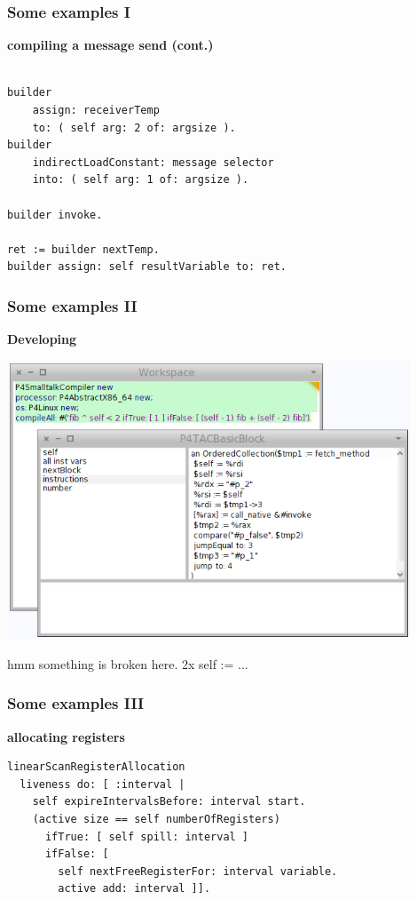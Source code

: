 \documentclass{beamer}
\begin{document}
\begin{frame}[fragile]
    \frametitle{Some examples I}
    {\bf compiling a message send (cont.)}
    \begin{lstlisting}
    
builder 
    assign: receiverTemp 
    to: ( self arg: 2 of: argsize ).
builder 
    indirectLoadConstant: message selector 
    into: ( self arg: 1 of: argsize ).
        
builder invoke.

ret := builder nextTemp.
builder assign: self resultVariable to: ret.

    \end{lstlisting}
\end{frame}

\begin{frame}[fragile]
    \frametitle{Some examples II}
    {\bf Developing}
    \begin{center}\includegraphics[width=0.9\textwidth]{developing.png}\end{center}
    hmm something is broken here. 2x self := ...
\end{frame}

\begin{frame}[fragile]
    \frametitle{Some examples III}
    {\bf allocating registers}
    \begin{lstlisting}
linearScanRegisterAllocation
  liveness do: [ :interval |
    self expireIntervalsBefore: interval start.
    (active size == self numberOfRegisters)
      ifTrue: [ self spill: interval ]
      ifFalse: [ 
        self nextFreeRegisterFor: interval variable.  
        active add: interval ]].
    \end{lstlisting}
\end{frame}
\end{document}
